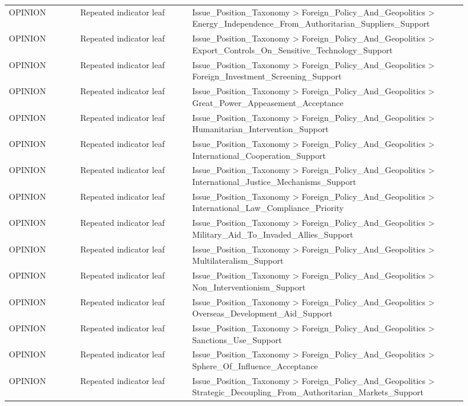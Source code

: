 \begin{table}[htbp]
\begin{threeparttable}
\begin{tabular}{p{0.14\linewidth}p{0.22\linewidth}p{0.54\linewidth}}
OPINION & Repeated indicator leaf & Issue\_Position\_Taxonomy > Foreign\_Policy\_And\_Geopolitics > Energy\_Independence\_From\_Authoritarian\_Suppliers\_Support \\
OPINION & Repeated indicator leaf & Issue\_Position\_Taxonomy > Foreign\_Policy\_And\_Geopolitics > Export\_Controls\_On\_Sensitive\_Technology\_Support \\
OPINION & Repeated indicator leaf & Issue\_Position\_Taxonomy > Foreign\_Policy\_And\_Geopolitics > Foreign\_Investment\_Screening\_Support \\
OPINION & Repeated indicator leaf & Issue\_Position\_Taxonomy > Foreign\_Policy\_And\_Geopolitics > Great\_Power\_Appeasement\_Acceptance \\
OPINION & Repeated indicator leaf & Issue\_Position\_Taxonomy > Foreign\_Policy\_And\_Geopolitics > Humanitarian\_Intervention\_Support \\
OPINION & Repeated indicator leaf & Issue\_Position\_Taxonomy > Foreign\_Policy\_And\_Geopolitics > International\_Cooperation\_Support \\
OPINION & Repeated indicator leaf & Issue\_Position\_Taxonomy > Foreign\_Policy\_And\_Geopolitics > International\_Justice\_Mechanisms\_Support \\
OPINION & Repeated indicator leaf & Issue\_Position\_Taxonomy > Foreign\_Policy\_And\_Geopolitics > International\_Law\_Compliance\_Priority \\
OPINION & Repeated indicator leaf & Issue\_Position\_Taxonomy > Foreign\_Policy\_And\_Geopolitics > Military\_Aid\_To\_Invaded\_Allies\_Support \\
OPINION & Repeated indicator leaf & Issue\_Position\_Taxonomy > Foreign\_Policy\_And\_Geopolitics > Multilateralism\_Support \\
OPINION & Repeated indicator leaf & Issue\_Position\_Taxonomy > Foreign\_Policy\_And\_Geopolitics > Non\_Interventionism\_Support \\
OPINION & Repeated indicator leaf & Issue\_Position\_Taxonomy > Foreign\_Policy\_And\_Geopolitics > Overseas\_Development\_Aid\_Support \\
OPINION & Repeated indicator leaf & Issue\_Position\_Taxonomy > Foreign\_Policy\_And\_Geopolitics > Sanctions\_Use\_Support \\
OPINION & Repeated indicator leaf & Issue\_Position\_Taxonomy > Foreign\_Policy\_And\_Geopolitics > Sphere\_Of\_Influence\_Acceptance \\
OPINION & Repeated indicator leaf & Issue\_Position\_Taxonomy > Foreign\_Policy\_And\_Geopolitics > Strategic\_Decoupling\_From\_Authoritarian\_Markets\_Support \\

\end{tabular}
\end{threeparttable}
\end{table}

